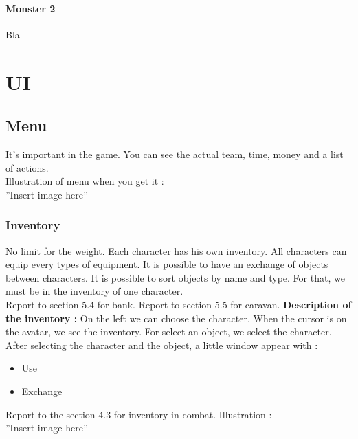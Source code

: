 \documentclass[a4paper,12pt]{book}
\begin{document}
\subsubsection{Monster 2}
Bla
\chapter{UI}
\section{Menu}
It's important in the game. You can see the actual team, time, money and a list of actions. \\ Illustration of menu when you get it : \\ ''Insert image here''
\subsection{Inventory}
No limit for the weight. Each character has his own inventory. All characters can equip every types of equipment. It is possible to have an exchange of objects between characters. It is possible to sort objects by name and type. For that, we must be in the inventory of one character. \\
Report to section 5.4 for bank.
Report to section 5.5 for caravan.
\textbf{Description of the inventory :} On the left we can choose the character. When the cursor is on the avatar, we see the inventory. For select an object, we select the character. After selecting the character and the object, a little window appear with :
\begin{itemize}
\item Use
\item Exchange
\end{itemize}
Report to the section 4.3 for inventory in combat.
Illustration : \\ ''Insert image here''
\end{document}
